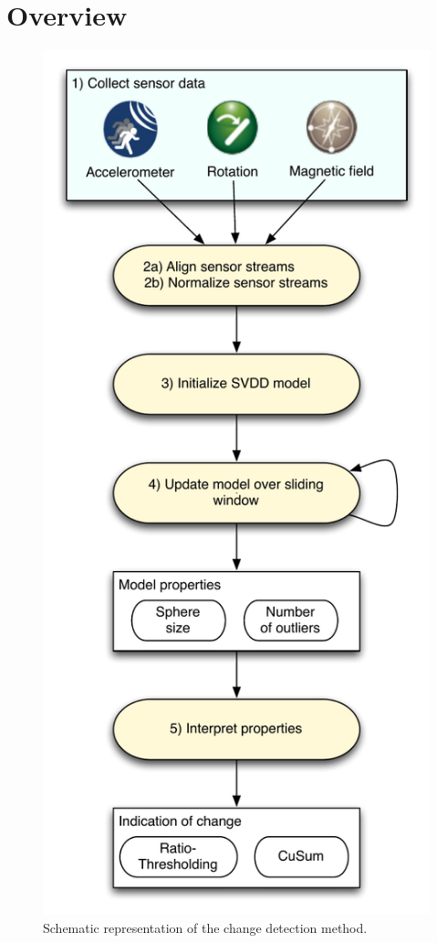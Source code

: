 \section{Overview}\label{sec:method_overview}

\begin{figure}
  \centering
    \includegraphics[width=\textwidth,height=\textheight,keepaspectratio]{./Figures/graphs/chapter4/method_setup.pdf}
  \caption[Method setup]{Schematic representation of the change detection method.}
  \label{fig:method_overview}
\end{figure}

